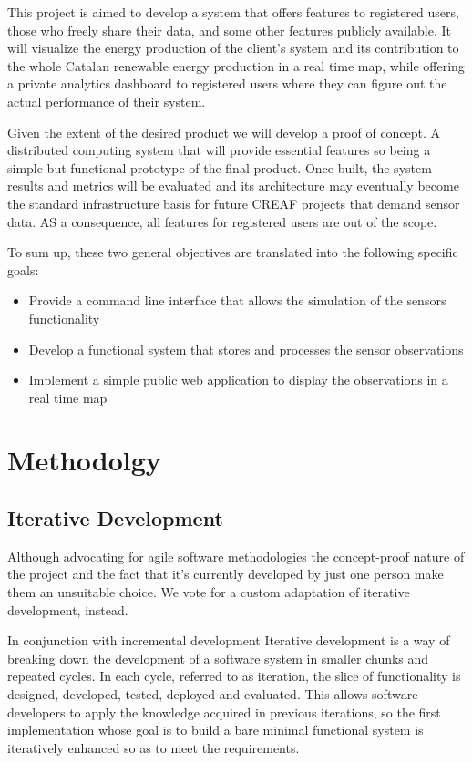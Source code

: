 This project is aimed to develop a system that offers features to registered users, those who freely share their data, and some other features publicly available. It will visualize the energy production of the client’s system and its contribution to the whole Catalan renewable energy production in a real time map, while offering a private analytics dashboard to registered users where they can figure out the actual performance of their system.

Given the extent of the desired product we will develop a proof of concept. A distributed computing system that will provide essential features so being a simple but functional prototype of the final product. Once built, the system results and metrics will be evaluated and its architecture may eventually become the standard infrastructure basis for future CREAF projects that demand sensor data. AS a consequence, all features for registered users are out of the scope.

To sum up, these two general objectives are translated into the following specific goals:

\begin{itemize}
	\item Provide a command line interface that allows the simulation of the sensors functionality
	\item Develop a functional system that stores and processes the sensor observations
	\item Implement a simple public web application to display the observations in a real time map
\end{itemize}

\section{Methodolgy}

\subsection{Iterative Development}
Although advocating for agile software methodologies the concept-proof nature of the project and the fact that it's currently developed by just one person make them an unsuitable choice. We vote for a custom adaptation of iterative development, instead.

In conjunction with incremental development Iterative development is a way of breaking down the development of a software system in smaller chunks and repeated cycles. In each cycle, referred to as iteration, the slice of functionality is designed, developed, tested, deployed and evaluated. This allows software developers to apply the knowledge acquired in previous iterations, so the first implementation whose goal is to build a bare minimal functional system is iteratively enhanced so as to meet the requirements.

